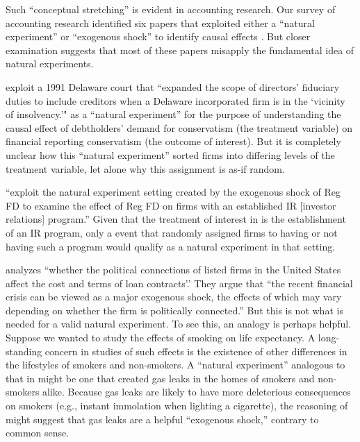 Such ``conceptual stretching'' is evident in accounting research.
Our survey of accounting research identified six papers that exploited either a ``natural experiment'' or ``exogenous shock'' to identify causal effects \citep{Lo:2013jk,Aier:2014ii,Kirk:2014gx,Houston:2014hv}. %
But closer examination suggests that most of these papers misapply the fundamental idea of natural experiments.

\cite{Aier:2014ii} exploit a 1991 Delaware court that ``expanded the scope of directors' fiduciary duties to include creditors when a Delaware incorporated firm is in the `vicinity of insolvency.'" as a ``natural experiment'' for the purpose of understanding the causal effect of debtholders' demand for conservatism (the treatment variable) on financial reporting conservatism (the outcome of interest). But it is completely unclear how this ``natural experiment'' sorted firms into differing levels of the treatment variable, let alone why this assignment is as-if random.

 \citet{Kirk:2014gx} ``exploit the natural experiment setting created by the exogenous shock of Reg FD to examine the effect of Reg FD on firms with an established IR [investor relations] program.'' 
Given that the treatment of interest in \citet{Kirk:2014gx} is the establishment of an IR program, only a event that randomly assigned firms to having or not having such a program would qualify as a natural experiment in that setting.

\cite{Houston:2014hv} analyzes ``whether the political connections of listed firms in the United States affect the cost and terms of loan contracts'.' They argue that ``the recent financial crisis can be viewed as a major exogenous shock, the effects of which may vary depending on whether the firm is politically connected.'' But this is not what is needed for a valid natural experiment. To see this, an analogy is perhaps helpful. Suppose we wanted to study the effects of smoking on life expectancy. A long-standing concern in studies of such effects is the existence of other differences in the lifestyles of smokers and non-smokers. A ``natural experiment'' analogous to that in \cite{Houston:2014hv} might be one that created gas leaks in the homes of smokers and non-smokers alike. Because gas leaks are likely to have more deleterious consequences on smokers (e.g., instant immolation when lighting a cigarette), the reasoning of \cite{Houston:2014hv} might suggest that gas leaks are a helpful ``exogenous shock,'' contrary to common sense.


